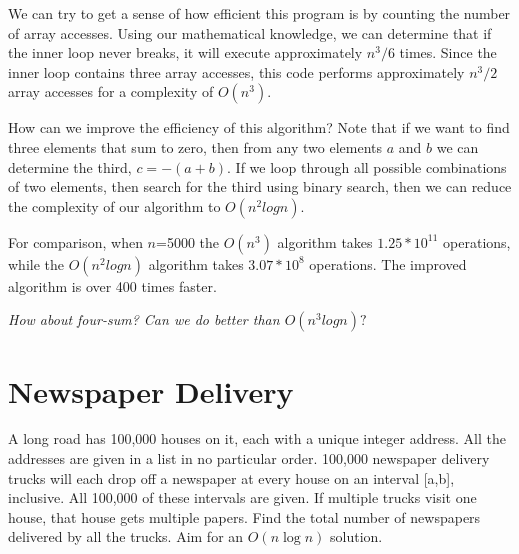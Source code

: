 \documentclass{article}
\begin{document}
We can try to get a sense of how efficient this program is by counting the number of array accesses. Using our mathematical knowledge, we can determine that if the inner loop never breaks, it will execute approximately $n^3/6$ times. Since the inner loop contains three array accesses, this code performs approximately $n^3/2$ array accesses for a complexity of $O(n^3)$.

How can we improve the efficiency of this algorithm? Note that if we want to find three elements that sum to zero, then from any two elements $a$ and $b$ we can determine the third, $c = -(a + b)$. If we loop through all possible combinations of two elements, then search for the third using binary search, then we can reduce the complexity of our algorithm to $O(n^2 log n)$.

For comparison, when $n$=5000 the $O(n^3)$ algorithm takes $1.25 * 10^{11}$ operations, while the $O(n^2 log n)$ algorithm takes $3.07 * 10^8$ operations. 
The improved algorithm is over 400 times faster.

\textit{How about four-sum? Can we do better than $O(n^3 log n)?$}

\section{Newspaper Delivery}
A long road has 100,000 houses on it, each with a unique integer address.  All the addresses are given in a list in no particular order. 100,000 newspaper delivery trucks will each drop off a newspaper at every house on an interval [a,b], inclusive.  All 100,000 of these intervals are given.  If multiple trucks visit one house, that house gets multiple papers.  Find the total number of newspapers delivered by all the trucks.  Aim for an $O(n \log n)$ solution.
\end{document}
